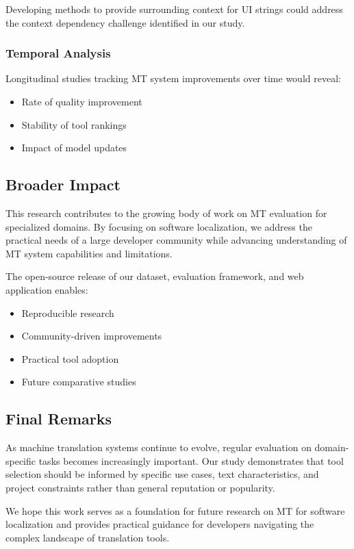 Developing methods to provide surrounding context for UI strings could address the context dependency challenge identified in our study.

\subsubsection{Temporal Analysis}

Longitudinal studies tracking MT system improvements over time would reveal:
\begin{itemize}
    \item Rate of quality improvement
    \item Stability of tool rankings
    \item Impact of model updates
\end{itemize}

\subsection{Broader Impact}

This research contributes to the growing body of work on MT evaluation for specialized domains. By focusing on software localization, we address the practical needs of a large developer community while advancing understanding of MT system capabilities and limitations.

The open-source release of our dataset, evaluation framework, and web application enables:
\begin{itemize}
    \item Reproducible research
    \item Community-driven improvements
    \item Practical tool adoption
    \item Future comparative studies
\end{itemize}

\subsection{Final Remarks}

As machine translation systems continue to evolve, regular evaluation on domain-specific tasks becomes increasingly important. Our study demonstrates that tool selection should be informed by specific use cases, text characteristics, and project constraints rather than general reputation or popularity.

We hope this work serves as a foundation for future research on MT for software localization and provides practical guidance for developers navigating the complex landscape of translation tools.

